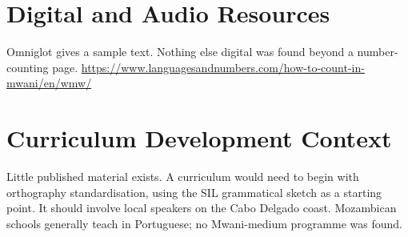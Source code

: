 \documentclass[12pt]{article}
\begin{document}
\section{Digital and Audio Resources}
Omniglot gives a sample text. Nothing else digital was found beyond a number-counting page. \url{https://www.languagesandnumbers.com/how-to-count-in-mwani/en/wmw/}

\section{Curriculum Development Context}
Little published material exists. A curriculum would need to begin with orthography standardisation, using the SIL grammatical sketch as a starting point. It should involve local speakers on the Cabo Delgado coast. Mozambican schools generally teach in Portuguese; no Mwani-medium programme was found.
\end{document}
